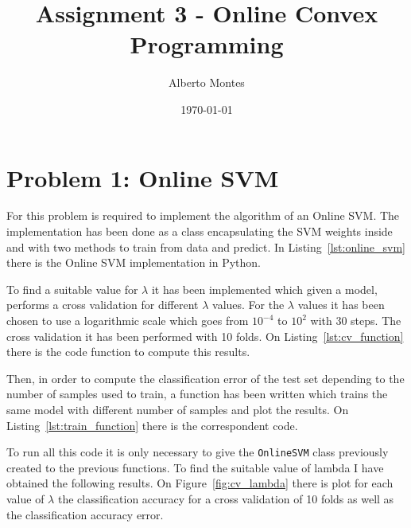 \documentclass{ethz_report}
\title{Assignment 3 - Online Convex Programming}
\author{Alberto Montes}
\date{\today}
\begin{document}
\maketitle

\section*{Problem 1: Online SVM}

For this problem is required to implement the algorithm of an Online SVM. The implementation has been done as a class encapsulating the SVM weights inside and with two methods to train from data and predict. In Listing~\ref{lst:online_svm} there is the Online SVM implementation in Python.



To find a suitable value for $\lambda$ it has been implemented which given a model, performs a cross validation for different $\lambda$ values. For the $\lambda$ values it has been chosen to use a logarithmic scale which goes from $10^{-4}$ to $10^2$ with 30 steps. The cross validation it has been performed with 10 folds. On Listing~\ref{lst:cv_function} there is the code function to compute this results.



Then, in order to compute the classification error of the test set depending to the number of samples used to train, a function has been written which trains the same model with different number of samples and plot the results. On Listing~\ref{lst:train_function} there is the correspondent code.



To run all this code it is only necessary to give the \texttt{OnlineSVM} class previously created to the previous functions. To find the suitable value of lambda I have obtained the following results. On Figure~\ref{fig:cv_lambda} there is plot for each value of $\lambda$ the classification accuracy for a cross validation of 10 folds as well as the classification accuracy error.
\end{document}
